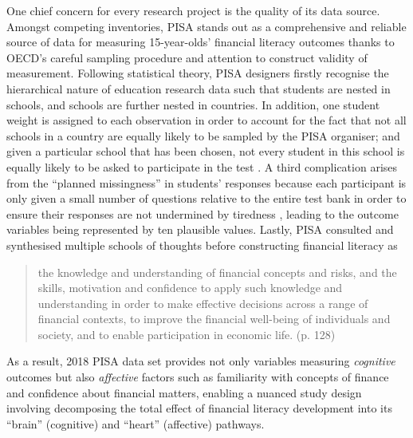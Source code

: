 \documentclass[a4paper,11pt,UKenglish,twoside,openright]{report}\usepackage[]{graphicx}\usepackage[]{color}
\begin{document}
One chief concern for every research project is the quality of its data source. Amongst competing inventories, PISA stands out as a comprehensive and reliable source of data for measuring 15-year-olds' financial literacy outcomes thanks to OECD's careful sampling procedure and attention to construct validity of measurement. Following statistical theory, PISA designers firstly recognise the hierarchical nature of education research data such that students are nested in schools, and schools are further nested in countries. In addition, one student weight is assigned to each observation in order to account for the fact that not all schools in a country are equally likely to be sampled by the PISA organiser; and given a particular school that has been chosen, not every student in this school is equally likely to be asked to participate in the test \parencite{rust:2014}. A third complication arises from the ``planned missingness'' in students' responses because each participant is only given a small number of questions relative to the entire test bank in order to ensure their responses are not undermined by tiredness \parencite{vondavier:2014}, leading to the outcome variables being represented by ten plausible values. Lastly, PISA consulted and synthesised multiple schools of thoughts \parencite{PISAframework} before constructing financial literacy as \blockquote{the knowledge and understanding of financial concepts and risks, and the skills, motivation and confidence to apply such knowledge and understanding in order to make effective decisions across a range of financial contexts, to improve the financial well-being of individuals and society, and to enable participation in economic life. (p. 128)} As a result, 2018 PISA data set \parencite{FLdata} provides not only variables measuring \emph{cognitive} outcomes but also \emph{affective} factors such as familiarity with concepts of finance and confidence about financial matters, enabling a nuanced study design involving decomposing the total effect of financial literacy development into its ``brain'' (cognitive) and ``heart'' (affective) pathways.
\end{document}
